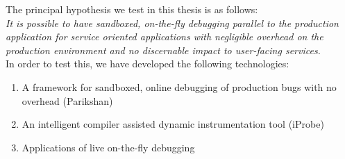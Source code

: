 \noindent The principal hypothesis we test in this thesis is as follows:\\

\emph{It is possible to have sandboxed, on-the-fly debugging parallel to the production application for service oriented applications with negligible overhead on the production environment and no discernable impact to user-facing services.}\\


In order to test this, we have developed the following technologies:
\begin{enumerate}
	\setlength{\itemsep}{0pt}
	\item A framework for sandboxed, online debugging of production bugs with no overhead (Parikshan)
	\item An intelligent compiler assisted dynamic instrumentation tool (iProbe)
	\item Applications of live on-the-fly debugging
\end{enumerate}


